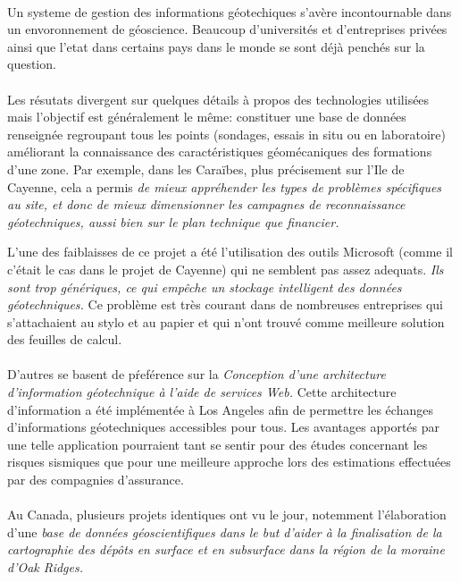 \paragraph{}
Un systeme de gestion des informations géotechiques s'avère incontournable
dans un envoronnement de géoscience. Beaucoup d'universités et d'entreprises 
privées ainsi que l'etat dans certains pays dans le monde se sont déjà 
penchés sur la question. 
\paragraph{}
Les résutats divergent sur quelques détails à propos des technologies utilisées mais 
l'objectif est généralement le même: 
constituer une base de données renseignée regroupant tous les points (sondages, essais
in situ ou en laboratoire) améliorant la connaissance des caractéristiques géomécaniques des
formations d'une zone.
Par exemple, dans les Caraïbes, plus précisement sur l'Ile de Cayenne, cela a permis
\textit{ de mieux appréhender les types de problèmes
spécifiques au site, et donc de mieux dimensionner les campagnes de reconnaissance
géotechniques, aussi bien sur le plan technique que financier.}
\cite{Cayenne}
\par
L'une des faiblaisses de ce projet a été l'utilisation des outils Microsoft (comme il c'était le 
cas dans le projet de Cayenne) qui ne semblent pas assez 
adequats. \textit{Ils sont trop génériques, ce qui empêche un stockage intelligent des données géotechniques.}
\cite{antoljak2012subsurface}
Ce problème est très courant dans de nombreuses entreprises qui s'attachaient au stylo et au papier
et qui n'ont trouvé comme meilleure solution des feuilles de calcul.


\paragraph{}D'autres se basent de pŕeférence sur la \textit{Conception d'une architecture d'information 
géotechnique à l'aide de services Web.}
\cite{zimmermann2003design}
Cette architecture d'information a été implémentée à Los Angeles afin de permettre les échanges 
d'informations géotechniques accessibles pour tous. Les avantages apportés par une telle 
application pourraient tant se sentir pour des études concernant les risques sismiques que pour 
une meilleure approche lors des estimations effectuées par des compagnies d'assurance. 

\paragraph{}
Au Canada, plusieurs projets identiques ont vu le jour, notemment l'élabora\-tion d'une \textit{base 
de données géoscientifiques dans le but d’aider à la finalisation de la 
cartographie des dépôts en surface et en subsurface dans la région de la moraine d’Oak 
Ridges.}
\cite{russell1996regional}

